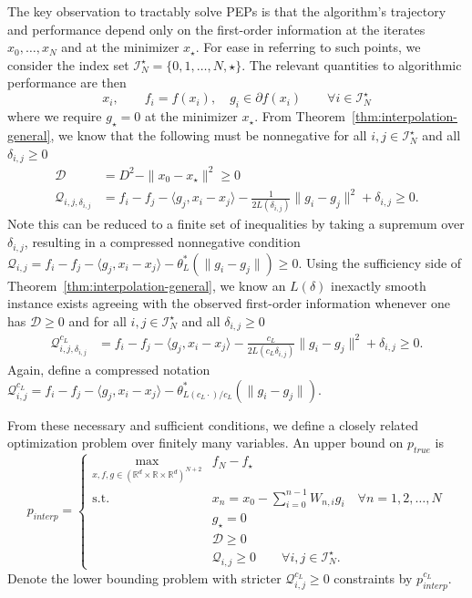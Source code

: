 \documentclass[11pt, hidelinks]{article}
\numberwithin{equation}{section}
\theoremstyle{thmstyletwo}%
\numberwithin{equation}{section}
\newcommand{\R}{\mathbb{R}}
\newcommand{\Ical}{\mathcal{I}}
\newcommand{\pPEP}[1]{p_{#1}}
\begin{document}
The key observation to tractably solve PEPs is that the algorithm's trajectory and performance depend only on the first-order information at the iterates $x_0,\dots,x_N$ and at the minimizer $x_\star$. For ease in referring to such points, we consider the index set $ \Ical_N^\star = \{0, 1, \dots, N, \star\}$. The relevant quantities to algorithmic performance are then
\begin{equation*}
    x_i, \qquad f_i = f(x_i), \quad g_i\in\partial f(x_i) \qquad \forall i \in \Ical_N^\star
\end{equation*}
where we require $g_\star=0$ at the minimizer $x_\star$. From Theorem~\ref{thm:interpolation-general}, we know that the following must be nonnegative for all $i,j\in \Ical_N^\star$ and all $\delta_{i,j}\geq 0$
\begin{align*}
    \mathcal{D} &= D^2 - \|x_0-x_\star\|^2 \geq 0\\
    \mathcal{Q}_{i,j,\delta_{i,j}} &= f_i - f_j - \langle g_j, x_i-x_j\rangle - \frac{1}{2L(\delta_{i,j})}\|g_i-g_j\|^2 + \delta_{i,j} \geq 0.
\end{align*}
Note this can be reduced to a finite set of inequalities by taking a supremum over $\delta_{i,j}$, resulting in a compressed nonnegative condition $\mathcal{Q}_{i,j} =  f_i - f_j - \langle g_j, x_i-x_j\rangle - \theta_L^*(\|g_i-g_j\|)\geq 0$.
Using the sufficiency side of Theorem~\ref{thm:interpolation-general}, we know an $L(\delta)$ inexactly smooth instance exists agreeing with the observed first-order information whenever one has $\mathcal{D}\geq 0$ and for all $i,j\in \Ical_N^\star$ and all $\delta_{i,j}\geq 0$
\begin{align*}
    \mathcal{Q}^{c_L}_{i,j,\delta_{i,j}} &= f_i - f_j - \langle g_j, x_i-x_j\rangle - \frac{c_L}{2L(c_L\delta_{i,j})}\|g_i-g_j\|^2 + \delta_{i,j}\geq 0.
\end{align*}
Again, define a compressed notation $\mathcal{Q}^{c_L}_{i,j} =  f_i - f_j -\langle g_j, x_i-x_j\rangle - \theta_{L(c_L\cdot)/c_L}^*(\|g_i-g_j\|)$.

From these necessary and sufficient conditions, we define a closely related optimization problem over finitely many variables. An upper bound on $\pPEP{true}$ is 
\begin{equation}\label{eq:Inexact-Primal-infinite-interpolation}
    \pPEP{interp} = \begin{cases}\displaystyle\max_{x,f,g \in (\R^d \times \R \times \R^d)^{N+2}} & f_N-f_\star  \\
    \mathrm{s.t.} & x_n = x_{0} - \sum_{i=0}^{n-1} W_{n,i} g_i \quad \forall n = 1, 2, \dots, N\\
    & g_\star = 0\\
    & \mathcal{D} \geq 0 \\
    & \mathcal{Q}_{i,j} \geq 0 \qquad  \forall i, j \in \Ical_N^\star.
    \end{cases}
\end{equation}
Denote the lower bounding problem with stricter $\mathcal{Q}_{i,j}^{c_L}\geq 0$ constraints by $\pPEP{interp}^{c_L}$.
\end{document}
